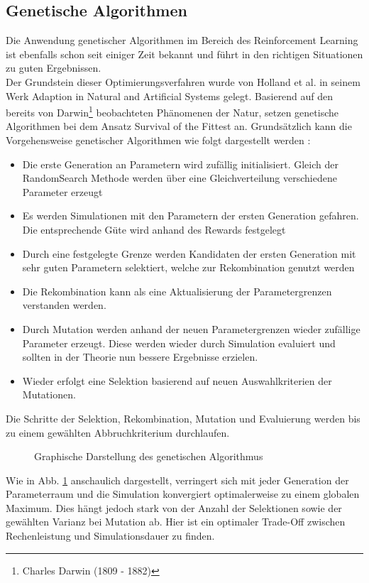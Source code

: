 	\subsection{Genetische Algorithmen}
		Die Anwendung genetischer Algorithmen im Bereich des Reinforcement Learning ist ebenfalls schon seit einiger Zeit bekannt und führt in den richtigen Situationen zu guten Ergebnissen.\\
		Der Grundstein dieser Optimierungsverfahren wurde von Holland et al. in seinem Werk \grqq Adaption in Natural and Artificial Systems \glqq{} \cite{Holland1992} gelegt. Basierend auf den bereits von Darwin\footnote{Charles Darwin (1809 - 1882)} beobachteten Phänomenen der Natur, setzen genetische Algorithmen bei dem Ansatz \glqq Survival of the Fittest\grqq{} an. Grundsätzlich kann die Vorgehensweise genetischer Algorithmen wie folgt dargestellt werden \cite{Goldberg1989}:
		\begin{itemize}
			\item Die erste Generation an Parametern wird zufällig initialisiert. Gleich der RandomSearch Methode werden über eine Gleichverteilung verschiedene Parameter erzeugt
			\item Es werden Simulationen mit den Parametern der ersten Generation gefahren. Die entsprechende Güte wird anhand des Rewards festgelegt
			\item Durch eine festgelegte Grenze werden Kandidaten der ersten Generation mit sehr guten Parametern selektiert, welche zur Rekombination genutzt werden
			\item Die Rekombination kann als eine Aktualisierung der Parametergrenzen verstanden werden.
			\item Durch Mutation werden anhand der neuen Parametergrenzen wieder zufällige Parameter erzeugt. Diese werden wieder durch Simulation evaluiert und sollten in der Theorie nun bessere Ergebnisse erzielen.
			\item Wieder erfolgt eine Selektion basierend auf neuen Auswahlkriterien der Mutationen.
		\end{itemize}
		Die Schritte der Selektion, Rekombination, Mutation und Evaluierung werden bis zu einem gewählten Abbruchkriterium durchlaufen.
		\begin{figure}[H] %
			\centering
			\def\svgwidth{12cm}
			
			\caption{Graphische Darstellung des genetischen Algorithmus}
			\label{fig:gen_chart}
		\end{figure}
		Wie in Abb. \ref{fig:gen_chart} anschaulich dargestellt, verringert sich mit jeder Generation der Parameterraum und die Simulation konvergiert optimalerweise zu einem globalen Maximum. Dies hängt jedoch stark von der Anzahl der Selektionen sowie der gewählten Varianz bei Mutation ab. Hier ist ein optimaler Trade-Off zwischen Rechenleistung und Simulationsdauer zu finden.
